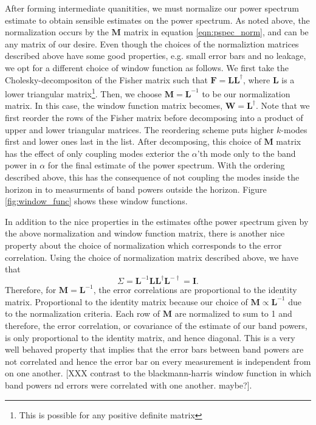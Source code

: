 \documentclass[twocolumn,numberedappendix]{emulateapj} \shorttitle{PSA64}
\begin{document}
After forming intermediate quanitities, we must normalize our power spectrum
estimate to obtain sensible estimates on the power spectrum. As noted above, the
normalization occurs by the $\mathbf{M}$ matrix in equation
\ref{eqn:pspec_norm}, and can be any matrix of our desire. 
Even though the choices of the normaliztion matrices described above have some
good properties, e.g. small error bars and no leakage, we opt for a different
choice of window function as follows. We first take the Cholesky-decompositon of
the Fisher matrix such that $\mathbf{F} = \mathbf{L}\mathbf{L}^{\dagger}$, where
$\mathbf{L}$ is a lower triangular matrix\footnote{This is possible for any
positive definite matrix}. Then, we choose ${\mathbf{M}} = \mathbf{L}^{-1}$ to
be our normalization matrix. In this case, the window function matrix becomes,
$\mathbf{W}=\mathbf{L}^{\dagger}$. Note that we first reorder the rows of the
Fisher matrix before decomposing into a product of upper and lower triangular
matrices. The reordering scheme puts higher $k$-modes first and lower ones last
in the list. After decomposing, this choice of $\mathbf{M}$ matrix has the
effect of only coupling modes exterior the $\alpha$'th mode only to the band
power in $\alpha$  for the final estimate of the power spectrum.  With the
ordering described above, this has the consequence of not coupling the modes
inside the horizon in to measurments of band powers outside the horizon. Figure
\ref{fig:window_func} shows these window functions. 

In addition to the nice properties in the estimates ofthe power spectrum given
by the above normalization and window function matrix, there is another nice
property about the choice of normalization which corresponds to the error
correlation. Using the choice of normalization matrix described above, we have
that \begin{equation} 
    \Sigma = \mathbf{L}^{-1}\mathbf{L}\mathbf{L}^{\dagger}\mathbf{L}^{-\dagger}
           = \mathbf{I}.
\end{equation}
Therefore, for $\mathbf{M}=\mathbf{L}^{-1}$, the error correlations are
proportional to the identity matrix. Proportional to the identity matrix because
our choice of $\mathbf{M} \propto \mathbf{L}^{-1}$ due to the normalization
criteria. Each row of $\mathbf{M}$ are normalized to sum to 1 and therefore,
the error correlation, or covariance of the estimate of our band powers, is only
proportional to the identity matrix, and hence diagonal. This is a very well
behaved property that implies that the error bars between band powers are not
correlated and hence the error bar on every measurement is independent from on
one another. [XXX contrast to the blackmann-harris window function in which
band powers nd errors were correlated with one another. maybe?].
\end{document}
